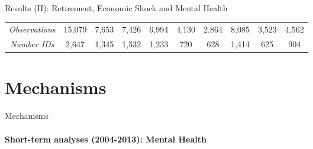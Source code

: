\documentclass{beamer}
\begin{document}
\begin{frame}{Results (II): Retirement, Economic Shock and Mental Health}
\begin{table}[h]
{\begin{tabular}{@{}lccccccccc@{}}
\multicolumn{1}{c}{\textit{Observations}} & 15,079 & 7,653 & 7,426 & 6,994 & 4,130 & 2,864 & 8,085 & 3,523 & 4,562 \\
\multicolumn{1}{c}{\textit{Number IDs}} & 2,647 & 1,345 & 1,532 & 1,233 & 720 & 628 & 1,414 & 625 & 904 \\ \bottomrule
\end{tabular}%
}
\end{table}

\end{frame}
\section{Mechanisms}
\begin{frame}{Mechanisms}
   \framesubtitle{Short-term analyses (2004-2013): Mental Health} 

  \begin{table}[h]
\centering


\end{table}
\end{frame}
\end{document}
